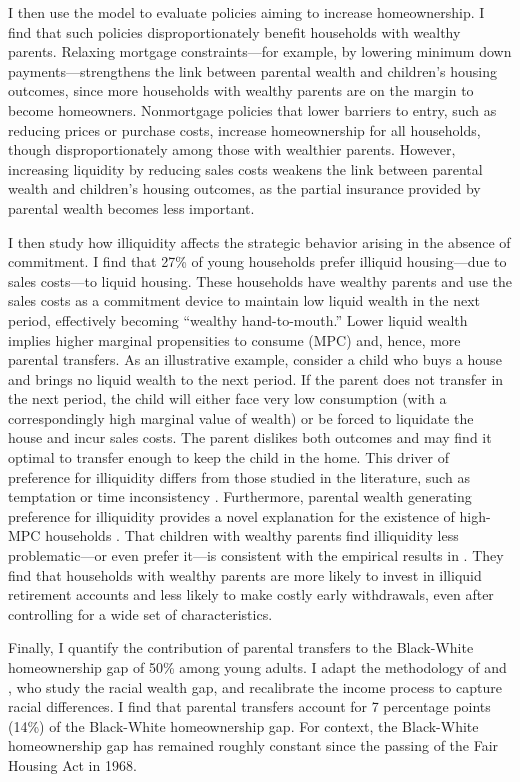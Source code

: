 \documentclass[12pt]{article}
\begin{document}
I then use the model to evaluate policies aiming to increase homeownership. I find that such policies disproportionately benefit households with wealthy parents. Relaxing mortgage constraints---for example, by lowering minimum down payments---strengthens the link between parental wealth and children's housing outcomes, since more households with wealthy parents are on the margin to become homeowners. Nonmortgage policies that lower barriers to entry, such as reducing prices or purchase costs, increase homeownership for all households, though disproportionately among those with wealthier parents. However, increasing liquidity by reducing sales costs weakens the link between parental wealth and children's housing outcomes, as the partial insurance provided by parental wealth becomes less important.

I then study how illiquidity affects the strategic behavior arising in the absence of commitment. I find that 27\% of young households prefer illiquid housing---due to sales costs---to liquid housing. These households have wealthy parents and use the sales costs as a commitment device to maintain low liquid wealth in the next period, effectively becoming ``wealthy hand-to-mouth.'' Lower liquid wealth implies higher marginal propensities to consume (MPC) and, hence, more parental transfers. As an illustrative example, consider a child who buys a house and brings no liquid wealth to the next period. If the parent does not transfer in the next period, the child will either face very low consumption (with a correspondingly high marginal value of wealth) or be forced to liquidate the house and incur sales costs. The parent dislikes both outcomes and may find it optimal to transfer enough to keep the child in the home. This driver of preference for illiquidity differs from those studied in the literature, such as temptation or time inconsistency \citep{attanasio2024temptation,laibson1997golden}. Furthermore, parental wealth generating preference for illiquidity provides a novel explanation for the existence of high-MPC households \cite[see e.g.,][]{kaplan2022marginal}. That children with wealthy parents find illiquidity less problematic---or even prefer it---is consistent with the empirical results in \cite{choukhmane2023benefits}. They find that households with wealthy parents are more likely to invest in illiquid retirement accounts and less likely to make costly early withdrawals, even after controlling for a wide set of characteristics. 

Finally, I quantify the contribution of parental transfers to the Black-White homeownership gap of 50\% among young adults. I adapt the methodology of \cite{Ashman2020} and \cite{aliprantis2022dynamics}, who study the racial wealth gap, and recalibrate the income process to capture racial differences. I find that parental transfers account for 7 percentage points (14\%) of the Black-White homeownership gap. For context, the Black-White homeownership gap has remained roughly constant since the passing of the Fair Housing Act in 1968.
\end{document}
